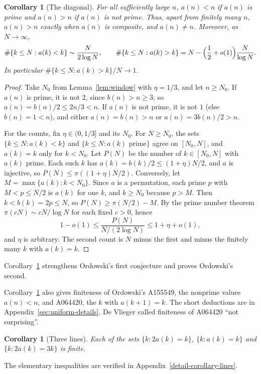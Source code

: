 \documentclass[11pt]{article}
\newtheorem{corollary}[theorem]{Corollary}
\theoremstyle{remark}
\begin{document}
\begin{corollary}[The diagonal]\label{cor:sign}
For all sufficiently large $n$, $a(n)<n$ if $a(n)$ is prime and
$a(n)>n$ if $a(n)$ is not prime. Thus, apart from finitely many $n$,
$a(n)>n$ exactly when $a(n)$ is composite, and $a(n)\neq n$. Moreover,
as $N\to\infty$,
\[
 \#\{k\leq N:a(k)<k\}\sim\frac{N}{2\log N},\qquad
 \#\{k\leq N:a(k)>k\}=N-\Bigl(\frac12+o(1)\Bigr)\frac{N}{\log N}.
\]
In particular $\#\{k\leq N:a(k)>k\}/N\to1$.
\end{corollary}
\begin{proof}
Take $N_0$ from Lemma~\ref{lem:window} with $\eta=1/3$, and let
$n\geq N_0$. If $a(n)$ is prime, it is not $2$, since $b(n)>n\geq3$;
so $a(n)=b(n)/2\leq2n/3<n$. If $a(n)$ is not prime, it is not $1$
(else $b(n)=1<n$), and either $a(n)=b(n)>n$ or $a(n)=3b(n)/2>n$.

For the counts, fix $\eta\in(0,1/3]$ and its $N_0$. For $N\geq N_0$,
the sets $\{k\leq N:a(k)<k\}$ and $\{k\leq N:a(k)\text{ prime}\}$ agree
on $[N_0,N]$, and $a(k)=k$ only for $k<N_0$. Let $P(N)$ be the number
of $k\in[N_0,N]$ with $a(k)$ prime. Each such $k$ has
$a(k)=b(k)/2\leq(1+\eta)N/2$, and $a$ is injective, so
$P(N)\leq\pi((1+\eta)N/2)$. Conversely, let
$M=\max\{a(k):k<N_0\}$. Since $a$ is a permutation, each prime $p$
with $M<p\leq N/2$ is $a(k)$ for one $k$, and $k\geq N_0$ because
$p>M$. Then $k<b(k)=2p\leq N$, so $P(N)\geq\pi(N/2)-M$. By the prime
number theorem $\pi(cN)\sim cN/\log N$ for each fixed $c>0$, hence
\[
 1-o(1)\leq\frac{P(N)}{N/(2\log N)}\leq1+\eta+o(1),
\]
and $\eta$ is arbitrary. The second count is $N$ minus the first and
minus the finitely many $k$ with $a(k)=k$.
\end{proof}

Corollary~\ref{cor:sign} strengthens Ordowski's first conjecture and proves Ordowski's second.

Corollary~\ref{cor:sign} also gives finiteness of Ordowski's A155549,
the nonprime values $a(n)<n$, and A064420, the $k$ with $a(k+1)=k$.
The short deductions are in Appendix~\ref{sec:uniform-details}.
De Vlieger \cite{devlieger} called finiteness of A064420 ``not surprising''.

\begin{corollary}[Three lines]\label{cor:lines}
Each of the sets $\{k:2a(k)=k\}$, $\{k:a(k)=k\}$ and $\{k:2a(k)=3k\}$
is finite.
\end{corollary}
\noindent The elementary inequalities are verified in Appendix~\ref{detail-corollary-lines}.
\end{document}
